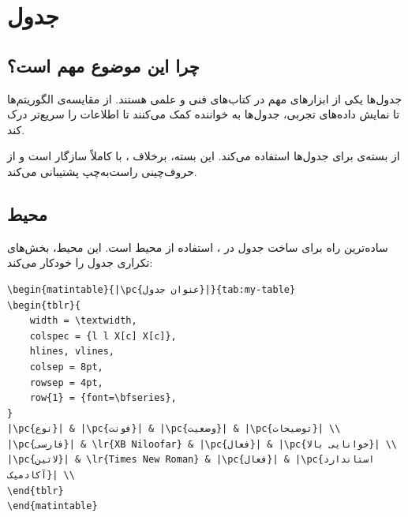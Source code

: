 
\chapter{جدول}
\label{chap:tables}

\section{چرا این موضوع مهم است؟}
\label{sec:tables-why}

جدول‌ها یکی از ابزارهای مهم در کتاب‌های فنی و
علمی هستند. از مقایسه‌ی الگوریتم‌ها تا نمایش
داده‌های تجربی، جدول‌ها به خواننده کمک می‌کنند
تا اطلاعات را سریع‌تر درک کند.

 از بسته‌ی  برای
جدول‌ها استفاده می‌کند. این بسته، برخلاف
، با  کاملاً سازگار
است و از حروف‌چینی راست‌به‌چپ پشتیبانی می‌کند.


\section{محیط }
\label{sec:tables-matintable}

ساده‌ترین راه برای ساخت جدول در ،
استفاده از محیط  است. این
محیط، بخش‌های تکراری جدول را خودکار می‌کند:

\begin{latin}
\begin{verbatim}
\begin{matintable}{|\pc{عنوان جدول}|}{tab:my-table}
\begin{tblr}{
    width = \textwidth,
    colspec = {l l X[c] X[c]},
    hlines, vlines,
    colsep = 8pt,
    rowsep = 4pt,
    row{1} = {font=\bfseries},
}
|\pc{نوع}| & |\pc{فونت}| & |\pc{وضعیت}| & |\pc{توضیحات}| \\
|\pc{فارسی}| & \lr{XB Niloofar} & |\pc{فعال}| & |\pc{خوانایی بالا}| \\
|\pc{لاتین}| & \lr{Times New Roman} & |\pc{فعال}| & |\pc{استاندارد آکادمیک}| \\
\end{tblr}
\end{matintable}
\end{verbatim}
\end{latin}


